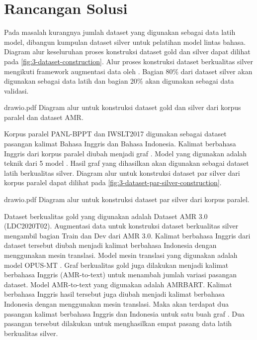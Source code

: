 \section{Rancangan Solusi}

Pada masalah kurangnya jumlah dataset yang digunakan sebagai data latih model, dibangun kumpulan dataset silver untuk pelatihan model \amrparsing{} lintas bahasa.
Diagram alur keseluruhan proses konstruksi dataset gold dan silver dapat dilihat pada \cref{fig:3-dataset-construction}.
Alur proses konstruksi dataset berkualitas silver mengikuti framework augmentasi data oleh \textcite{lee2022}.
Bagian 80\% dari dataset silver akan digunakan sebagai data latih dan bagian 20\% akan digunakan sebagai data validasi.

  {drawio.pdf}
  {Diagram alur untuk konstruksi dataset gold dan silver dari korpus paralel dan dataset AMR.}

Korpus paralel PANL-BPPT dan IWSLT2017 digunakan sebagai dataset pasangan kalimat Bahasa Inggris dan Bahasa Indonesia.
Kalimat berbahasa Inggris dari korpus paralel diubah menjadi graf \AMR{}.
Model \amrparsing{} yang digunakan adalah teknik  dari 5 model \sota{} .
Hasil graf \AMR{} yang dihasilkan akan digunakan sebagai dataset latih berkualitas silver.
Diagram alur untuk konstruksi dataset par silver dari korpus paralel dapat dilihat pada \cref{fig:3-dataset-par-silver-construction}.

  {drawio.pdf}
  {Diagram alur untuk konstruksi dataset par silver dari korpus paralel.}

Dataset \AMR{} berkualitas gold yang digunakan adalah Dataset AMR 3.0 (LDC2020T02).
Augmentasi data untuk konstruksi dataset berkualitas silver mengambil bagian Train dan Dev  dari AMR 3.0.
Kalimat berbahasa Inggris dari dataset \AMR{} tersebut diubah menjadi kalimat berbahasa Indonesia dengan menggunakan mesin translasi.
Model mesin translasi yang digunakan adalah model {OPUS-MT} .
Graf \AMR{} berkualitas gold juga dilakukan  menjadi kalimat berbahasa Inggris (AMR-to-text) untuk menambah jumlah variasi pasangan dataset.
Model AMR-to-text yang digunakan adalah \gls{AMRBART}.
Kalimat berbahasa Inggris hasil  tersebut juga diubah menjadi kalimat berbahasa Indonesia dengan menggunakan mesin translasi.
Maka akan terdapat dua pasangan kalimat berbahasa Inggris dan Indonesia untuk satu buah graf \AMR{}.
Dua pasangan tersebut dilakukan  untuk menghasilkan empat pasang data latih berkualitas silver.

